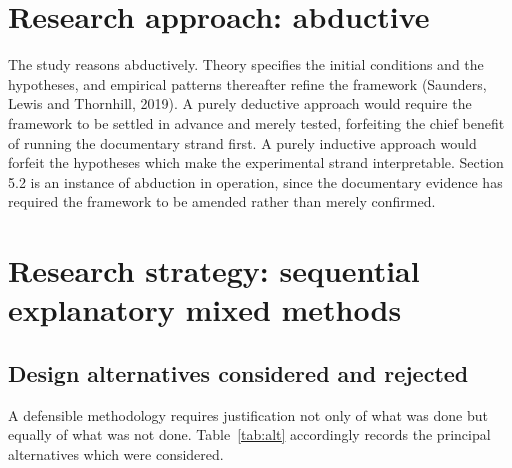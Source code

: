\documentclass[12pt,a4paper]{article}
\begin{document}
\section{Research approach: abductive}

The study reasons abductively. Theory specifies the initial conditions and the hypotheses, and
empirical patterns thereafter refine the framework (Saunders, Lewis and Thornhill, 2019). A purely
deductive approach would require the framework to be settled in advance and merely tested,
forfeiting the chief benefit of running the documentary strand first. A purely inductive approach
would forfeit the hypotheses which make the experimental strand interpretable. Section 5.2 is an
instance of abduction in operation, since the documentary evidence has required the framework to
be amended rather than merely confirmed.

\section{Research strategy: sequential explanatory mixed methods}

\subsection{Design alternatives considered and rejected}

A defensible methodology requires justification not only of what was done but equally of what was not done.
Table~\ref{tab:alt} accordingly records the principal alternatives which were considered.
\end{document}
